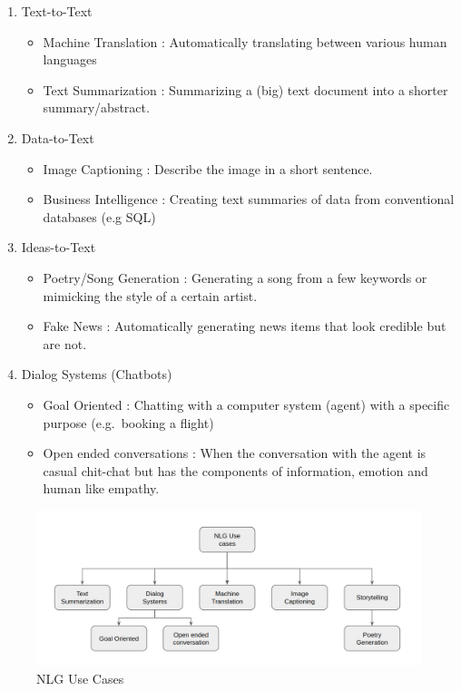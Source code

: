 \documentclass[]{krantz}
\providecommand{\tightlist}{%
  \setlength{\itemsep}{0pt}\setlength{\parskip}{0pt}}
\begin{document}
\begin{enumerate}
\def\labelenumi{\arabic{enumi}.}
\tightlist
\item
  Text-to-Text

  \begin{itemize}
  \tightlist
  \item
    Machine Translation : Automatically translating between various human languages
  \item
    Text Summarization : Summarizing a (big) text document into a shorter summary/abstract.
  \end{itemize}
\item
  Data-to-Text

  \begin{itemize}
  \tightlist
  \item
    Image Captioning : Describe the image in a short sentence.
  \item
    Business Intelligence : Creating text summaries of data from conventional databases (e.g SQL)
  \end{itemize}
\item
  Ideas-to-Text

  \begin{itemize}
  \tightlist
  \item
    Poetry/Song Generation : Generating a song from a few keywords or mimicking the style of a certain artist.
  \item
    Fake News : Automatically generating news items that look credible but are not.
  \end{itemize}
\item
  Dialog Systems (Chatbots)

  \begin{itemize}
  \tightlist
  \item
    Goal Oriented : Chatting with a computer system (agent) with a specific purpose (e.g.~booking a flight)
  \item
    Open ended conversations : When the conversation with the agent is casual chit-chat but has the components of information, emotion and human like empathy.
  \end{itemize}
\end{enumerate}

\begin{figure}
\centering
\includegraphics{figures/04-01-use-case1/nlg_use_cases.png}
\caption{NLG Use Cases}
\end{figure}
\end{document}
